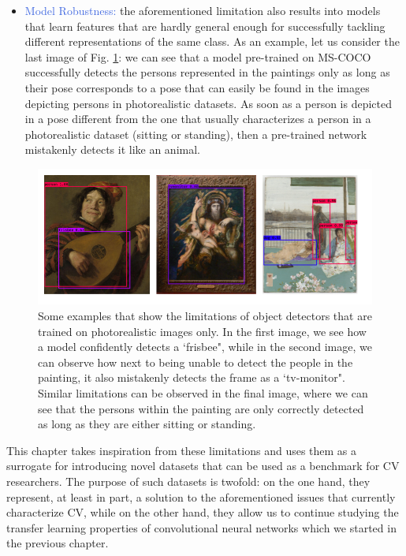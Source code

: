 \begin{itemize}
	\item \textcolor{RoyalBlue}{Model Robustness:} the aforementioned limitation also results into models that learn features that are hardly general enough for successfully tackling different representations of the same class. As an example, let us consider the last image of Fig. \ref{fig:fails}: we can see that a model pre-trained on MS-COCO successfully detects the persons represented in the paintings only as long as their pose corresponds to a pose that can easily be found in the images depicting persons in photorealistic datasets. As soon as a person is depicted in a pose different from the one that usually characterizes a person in a photorealistic dataset (sitting or standing), then a pre-trained network mistakenly detects it like an animal.   
\end{itemize}

\begin{figure}[ht!]
\centering
  \includegraphics[width=\linewidth]{./Images/Chapter05/fails}
  \caption{Some examples that show the limitations of object detectors that are trained on photorealistic images only. In the first image, we see how a model confidently detects a `frisbee", while in the second image, we can observe how next to being unable to detect the people in the painting, it also mistakenly detects the frame as a `tv-monitor". Similar limitations can be observed in the final image, where we can see that the persons within the painting are only correctly detected as long as they are either sitting or standing.}
  \label{fig:fails}
\end{figure}

This chapter takes inspiration from these limitations and uses them as a surrogate for introducing novel datasets that can be used as a benchmark for CV researchers. The purpose of such datasets is twofold: on the one hand, they represent, at least in part, a solution to the aforementioned issues that currently characterize CV, while on the other hand, they allow us to continue studying the transfer learning properties of convolutional neural networks which we started in the previous chapter.  

